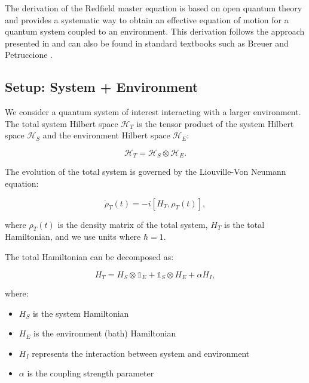 The derivation of the Redfield master equation is based on open quantum theory and provides a systematic way to obtain an effective equation of motion for a quantum system coupled to an environment. This derivation follows the approach presented in \cite{Manzano2020ShortIntroductionLindblad} and can also be found in standard textbooks such as Breuer and Petruccione \cite{BreuerPetruccione2009TheoryOpenQuantum}.

\subsection{Setup: System + Environment}

We consider a quantum system of interest interacting with a larger environment. The total system Hilbert space $\mathcal{H}_T$ is the tensor product of the system Hilbert space $\mathcal{H}_S$ and the environment Hilbert space $\mathcal{H}_E$:

\begin{equation}
    \mathcal{H}_T = \mathcal{H}_S \otimes \mathcal{H}_E.
    \label{eq:Total_Hilbert_Space}
\end{equation}

The evolution of the total system is governed by the Liouville-Von Neumann equation:

\begin{equation}
    \dot{\rho}_T(t) = -i[H_T, \rho_T(t)],
    \label{eq:Von_Neumann_Equation}
\end{equation}

where $\rho_T(t)$ is the density matrix of the total system, $H_T$ is the total Hamiltonian, and we use units where $\hbar = 1$.

The total Hamiltonian can be decomposed as:

\begin{equation}
    H_T = H_S \otimes \mathbb{1}_E + \mathbb{1}_S \otimes H_E + \alpha H_I,
    \label{eq:Total_Hamiltonian}
\end{equation}

where:
\begin{itemize}
    \item $H_S$ is the system Hamiltonian
    \item $H_E$ is the environment (bath) Hamiltonian
    \item $H_I$ represents the interaction between system and environment
    \item $\alpha$ is the coupling strength parameter
\end{itemize}

